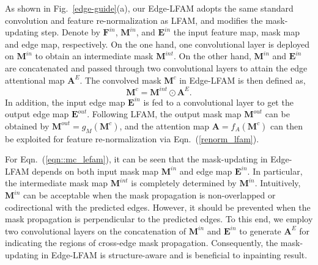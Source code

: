 \documentclass[10pt,journal,compsoc]{IEEEtran}
\begin{document}
As shown in Fig.~\ref{edge-guide}(a), our Edge-LFAM adopts the same standard convolution and feature re-normalization as LFAM, and modifies the mask-updating step.
%
Denote by $\mathbf{F}^{in}$, $\mathbf{M}^{in}$, and $\mathbf{E}^{in}$ the input feature map, mask map and edge map, respectively.
%
On the one hand, one convolutional layer is deployed on $\mathbf{M}^{in}$ to obtain an intermediate mask $\mathbf{M}^{int}$.
%
On the other hand, $\mathbf{M}^{in}$ and $\mathbf{E}^{in}$ are concatenated and passed through two convolutional layers to attain the edge attentional map $\mathbf{A}^{E}$.
%
The convolved mask $\mathbf{M}^{c}$ in Edge-LFAM is then defined as,
%
\begin{equation}\label{eqn::mc_lefam}
\mathbf{M}^{c} = \mathbf{M}^{int} \odot \mathbf{A}^{E}.
\end{equation}
%
In addition, the input edge map $\mathbf{E}^{in}$ is fed to a convolutional layer to get the output edge map $\mathbf{E}^{out}$.
%
Following LFAM, the output mask map $\mathbf{M}^{out}$ can be obtained by $\mathbf{M}^{out} = g_M(\mathbf{M}^{c})$, and the attention map $\mathbf{A} = f_A(\mathbf{M}^c)$ can then be exploited for feature re-normalization via Eqn.~(\ref{renorm_lfam}).



%



For Eqn.~(\ref{eqn::mc_lefam}), it can be seen that the mask-updating in Edge-LFAM depends on both input mask map $\mathbf{M}^{in}$ and edge map $\mathbf{E}^{in}$.
%
In particular, the intermediate mask map $\mathbf{M}^{int}$ is completely determined by $\mathbf{M}^{in}$.
%
Intuitively, $\mathbf{M}^{in}$ can be acceptable when the mask propagation is non-overlapped or codirectional with the predicted edges.
%
However, it should be prevented when the mask propagation is perpendicular to the predicted edges.
%
To this end, we employ two convolutional layers on the concatenation of $\mathbf{M}^{in}$ and $\mathbf{E}^{in}$ to generate $\mathbf{A}^{E}$ for indicating the regions of cross-edge mask propagation.
%
Consequently, the mask-updating in Edge-LFAM is structure-aware and is beneficial to inpainting result.


%
%
%
\end{document}

